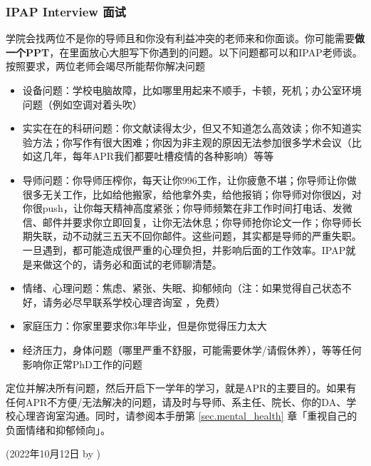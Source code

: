 \subsubsection{IPAP Interview 面试}
\label{sec.IPAP}
学院会找两位不是你的导师且和你没有利益冲突的老师来和你面谈。你可能需要\textbf{做一个PPT}，在里面放心大胆写下你遇到的问题。以下问题都可以和IPAP老师谈。按照要求，两位老师会竭尽所能帮你解决问题
\begin{itemize}
    \item 设备问题：学校电脑故障，比如哪里用起来不顺手，卡顿，死机；办公室环境问题（例如空调对着头吹）
    \item 实实在在的科研问题：你文献读得太少，但又不知道怎么高效读；你不知道实验方法；你写作有很大困难；你因为非主观的原因无法参加很多学术会议（比如这几年，每年APR我们都要吐槽疫情的各种影响）等等
    \item 导师问题：你导师压榨你，每天让你996工作，让你疲惫不堪；你导师让你做很多无关工作，比如给他搬家，给他拿外卖，给他报销；你导师对你很凶，对你很push，让你每天精神高度紧张；你导师频繁在非工作时间打电话、发微信、邮件并要求你立即回复，让你无法休息；你导师抢你论文一作；你导师长期失联，动不动就三五天不回你邮件。这些问题，其实都是导师的严重失职。一旦遇到，都可能造成很严重的心理负担，并影响后面的工作效率。IPAP就是来做这个的，请务必和面试的老师聊清楚。
    \item 情绪、心理问题：焦虑、紧张、失眠、抑郁倾向（注：如果觉得自己状态不好，请务必尽早联系学校心理咨询室  ，免费）
    \item 家庭压力：你家里要求你3年毕业，但是你觉得压力太大
    \item 经济压力，身体问题（哪里严重不舒服，可能需要休学/请假休养），等等任何影响你正常PhD工作的问题
\end{itemize}

\vspace{5mm}
定位并解决所有问题，然后开启下一学年的学习，就是APR的主要目的。如果有任何APR不方便/无法解决的问题，请及时与导师、系主任、院长、你的DA、学校心理咨询室沟通。同时，请参阅本手册第 \ref{sec.mental_health} 章「重视自己的负面情绪和抑郁倾向」。


\begin{flushright}
(2022年10月12日 by \Wu)
\end{flushright}